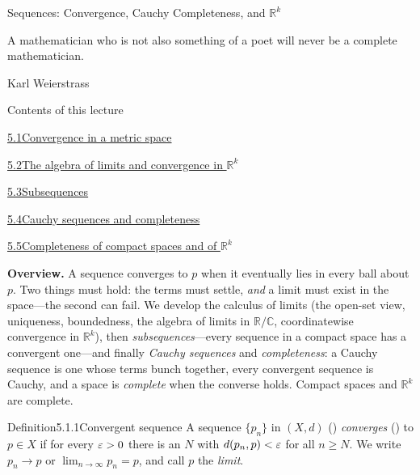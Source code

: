 \documentclass[main.tex]{subfiles}
\begin{document}
%
  {Sequences: Convergence, Cauchy Completeness, and \texorpdfstring{$\mathbb R^k$}{Rk}}

\epigraph{A mathematician who is not also something of a poet will never be a complete mathematician.}{Karl Weierstrass}

\begin{lecturecontents}{Contents of this lecture}
  \item \hyperlink{5.1}{5.1\quad Convergence in a metric space}
  \item \hyperlink{5.2}{5.2\quad The algebra of limits and convergence in $\mathbb R^k$}
  \item \hyperlink{5.3}{5.3\quad Subsequences}
  \item \hyperlink{5.4}{5.4\quad Cauchy sequences and completeness}
  \item \hyperlink{5.5}{5.5\quad Completeness of compact spaces and of $\mathbb R^k$}
\end{lecturecontents}

\bigskip
\noindent\textbf{Overview.} A sequence converges to $p$ when it eventually lies in every ball about
$p$. Two things must hold: the terms must settle, \emph{and} a limit must exist in the space---the
second can fail. We develop the calculus of limits (the open-set view, uniqueness, boundedness, the
algebra of limits in $\mathbb R/\mathbb C$, coordinatewise convergence in $\mathbb R^k$), then
\emph{subsequences}---every sequence in a compact space has a convergent one---and finally
\emph{Cauchy sequences} and \emph{completeness}: a Cauchy sequence is one whose terms bunch together,
every convergent sequence is Cauchy, and a space is \emph{complete} when the converse holds. Compact
spaces and $\mathbb R^k$ are complete.

\clearpage

\begin{Obj}{Definition}{5.1.1}{Convergent sequence}
A sequence $\{p_n\}$ in $(X,d)$ () \emph{converges} () to $p\in X$ if for every $\varepsilon>0$
there is an $N$ with $d(p_n,p)<\varepsilon$ for all $n\ge N$. We write $p_n\to p$ or $\lim_{n\to\infty}
p_n=p$, and call $p$ the \emph{limit}.
\end{Obj}
\end{document}
